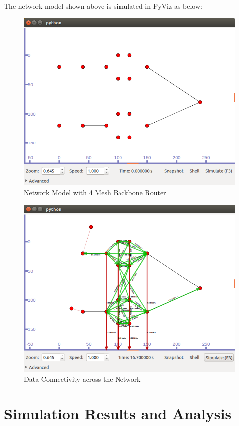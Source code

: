 \documentclass[12pt,a4paper]{report}
\begin{document}
The network model shown above is simulated in PyViz as below:
\begin{figure}[hbtp]
\centering
\includegraphics[scale=.4]{mesh-2x2.png}
\caption{Network Model with 4 Mesh Backbone Router}
\end{figure}


\begin{figure}[hbtp]
\centering
\includegraphics[scale=.45]{mesh-2x2-working.png}
\caption{Data Connectivity across the Network}
\end{figure}


\chapter{Simulation Results and Analysis}
\end{document}
